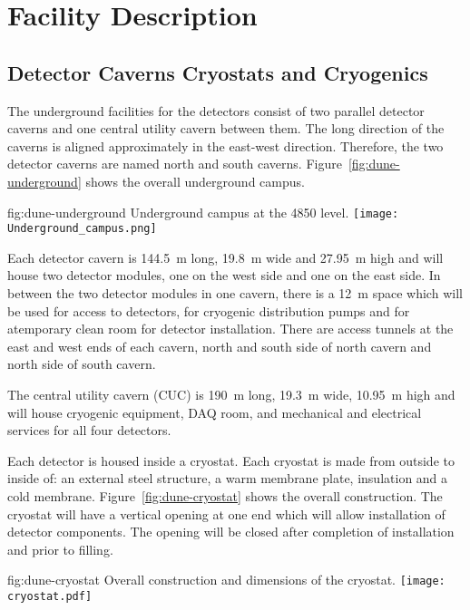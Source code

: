 ﻿\chapter{Facility Description}
\label{vl:tc-facility}


\section{Detector Caverns Cryostats and Cryogenics}
\label{sec:fdsp-coord-faci-caverns}


The underground facilities for the detectors consist of two parallel
detector caverns and one central utility cavern between them. The long
direction of the caverns is aligned approximately in the east-west
direction. Therefore, the two detector caverns are named north and
south caverns. Figure~\ref{fig:dune-underground} shows the overall
underground campus.
\begin{dunefigure}{fig:dune-underground}
  {Underground campus at the 4850 level.}
  \texttt{[image: Underground\_campus.png]}
\end{dunefigure}


Each detector cavern is \SI{144.5}{\meter} long, \SI{19.8}{\meter}
wide and \SI{27.95}{\meter} high and will house two detector modules,
one on the west side and one on the east side. In between the two
detector modules in one cavern, there is a \SI{12}{\meter} space which
will be used for access to detectors, for cryogenic distribution pumps
and for atemporary clean room for detector installation. There are
access tunnels at the east and west ends of each cavern, north and
south side of north cavern and north side of south cavern.


The central utility cavern (CUC) is \SI{190}{\meter} long, \SI{19.3}{\meter}
wide, \SI{10.95}{\meter} high and will house cryogenic equipment, DAQ
room, and mechanical and electrical services for all four
detectors.


Each detector is housed inside a cryostat. Each cryostat is made from
outside to inside of: an external steel structure, a warm membrane
plate, insulation and a cold membrane. Figure~\ref{fig:dune-cryostat}
shows the overall construction. The cryostat will have a vertical
opening at one end which will allow installation of detector
components. The opening will be closed after completion of
installation and prior to filling.
\begin{dunefigure}{fig:dune-cryostat}
  {Overall construction and dimensions of the  cryostat.}
  \texttt{[image: cryostat.pdf]}
\end{dunefigure}



